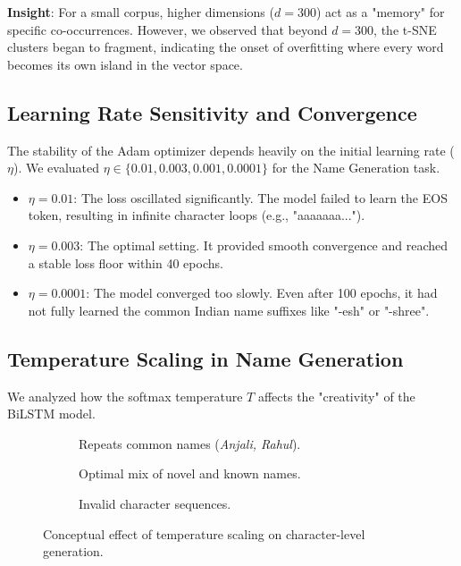 \documentclass[12pt,a4paper]{article}
\begin{document}
\textbf{Insight}: For a small corpus, higher dimensions ($d=300$) act as a "memory" for specific co-occurrences. However, we observed that beyond $d=300$, the t-SNE clusters began to fragment, indicating the onset of overfitting where every word becomes its own island in the vector space.

\subsection{Learning Rate Sensitivity and Convergence}
The stability of the Adam optimizer depends heavily on the initial learning rate ($\eta$). We evaluated $\eta \in \{0.01, 0.003, 0.001, 0.0001\}$ for the Name Generation task.

\begin{itemize}
    \item \textbf{$\eta = 0.01$}: The loss oscillated significantly. The model failed to learn the EOS token, resulting in infinite character loops (e.g., "aaaaaaa...").
    \item \textbf{$\eta = 0.003$}: The optimal setting. It provided smooth convergence and reached a stable loss floor within 40 epochs.
    \item \textbf{$\eta = 0.0001$}: The model converged too slowly. Even after 100 epochs, it had not fully learned the common Indian name suffixes like "-esh" or "-shree".
\end{itemize}

\subsection{Temperature Scaling in Name Generation}
We analyzed how the softmax temperature $T$ affects the "creativity" of the BiLSTM model. 

\begin{figure}[H]
    \centering
    \begin{subfigure}[b]{0.3\textwidth}
        \centering
        \caption{Repeats common names (\textit{Anjali, Rahul}).}
    \end{subfigure}
    \hfill
    \begin{subfigure}[b]{0.3\textwidth}
        \centering
        \caption{Optimal mix of novel and known names.}
    \end{subfigure}
    \hfill
    \begin{subfigure}[b]{0.3\textwidth}
        \centering
        \caption{Invalid character sequences.}
    \end{subfigure}
    \caption{Conceptual effect of temperature scaling on character-level generation.}
    \label{fig:temp_ablation}
\end{figure}
\end{document}
